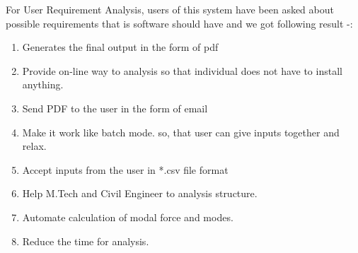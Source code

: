 For User Requirement Analysis, users of this system have been asked about 
possible requirements that is software should have and we got following
result -:
\begin{enumerate}
\item Generates the final output in the form of pdf
\item Provide on-line way to analysis so that individual does not have to 
install anything.
\item Send PDF to the user in the form of email
\item Make it work like batch mode. so, that user can give inputs 
together and relax.
\item Accept inputs from the user in *.csv file format
\item Help M.Tech and Civil Engineer to analysis structure.
\item Automate calculation of modal force and modes.
\item Reduce the time for analysis.
\end{enumerate}
